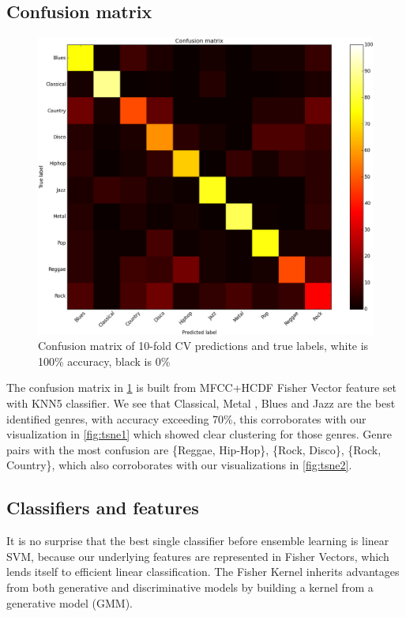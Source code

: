 \subsection{Confusion matrix}
\begin{figure}
	\includegraphics[width=\textwidth]{confusion_matrix.png}
	\caption{Confusion matrix of 10-fold CV predictions and true labels, white is 100\% accuracy, black is 0\%}
	\label{fig:confusion}
\end{figure}
The confusion matrix in \ref{fig:confusion} is built from MFCC+HCDF Fisher Vector feature set with KNN5 classifier. We see that Classical, Metal , Blues and Jazz are the best identified genres, with accuracy exceeding 70\%, this corroborates with our visualization in \ref{fig:tsne1} which showed clear clustering for those genres. Genre pairs with the most confusion are \{Reggae, Hip-Hop\}, \{Rock, Disco\}, \{Rock, Country\}, which also corroborates with our visualizations in \ref{fig:tsne2}. 
\subsection{Classifiers and features}
It is no surprise that the best single classifier before ensemble learning is linear SVM, because our underlying features are represented in Fisher Vectors, which lends itself to efficient linear classification.
The Fisher Kernel inherits advantages from both generative and discriminative models by building a kernel from a generative model (GMM).
